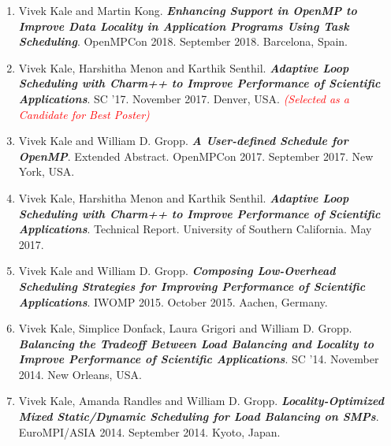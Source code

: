 



\begin{enumerate}


\item Vivek Kale and Martin Kong. \textbf{\it Enhancing Support in OpenMP to Improve Data Locality in Application Programs Using Task Scheduling}. OpenMPCon 2018. September 2018. Barcelona, Spain. 

\item Vivek Kale, Harshitha Menon and Karthik
  Senthil. \textbf{\textit{Adaptive Loop Scheduling with Charm++ to
      Improve Performance of Scientific Applications}}. SC '17. November 2017. Denver, USA. \textit{\textcolor{red}{(Selected as a Candidate
      for Best Poster)}} 

\item Vivek Kale and William D. Gropp. \textbf{\textit{A User-defined
    Schedule for OpenMP}}. Extended Abstract. OpenMPCon
  2017. September 2017. New York, USA.

\item Vivek Kale, Harshitha Menon and Karthik
  Senthil. \textbf{\textit{Adaptive Loop Scheduling with Charm++ to
      Improve Performance of Scientific Applications}}. Technical
  Report. University of Southern California. May 2017. 

\item Vivek Kale and William D. Gropp. \textbf{\textit{Composing
    Low-Overhead Scheduling Strategies for Improving Performance of
    Scientific Applications}}. IWOMP 2015. October 2015. Aachen, Germany.

\item Vivek Kale, Simplice Donfack, Laura Grigori and William
  D. Gropp. \textbf{\textit{Balancing the Tradeoff Between Load
      Balancing and Locality to Improve Performance of Scientific
      Applications}}. SC '14. November 2014. New Orleans, USA.

\item Vivek Kale, Amanda Randles and William D. Gropp. \textbf{\textit{Locality-Optimized Mixed Static/Dynamic
      Scheduling for Load Balancing on SMPs}}. EuroMPI/ASIA
  2014. September 2014. Kyoto, Japan.


\end{enumerate}
